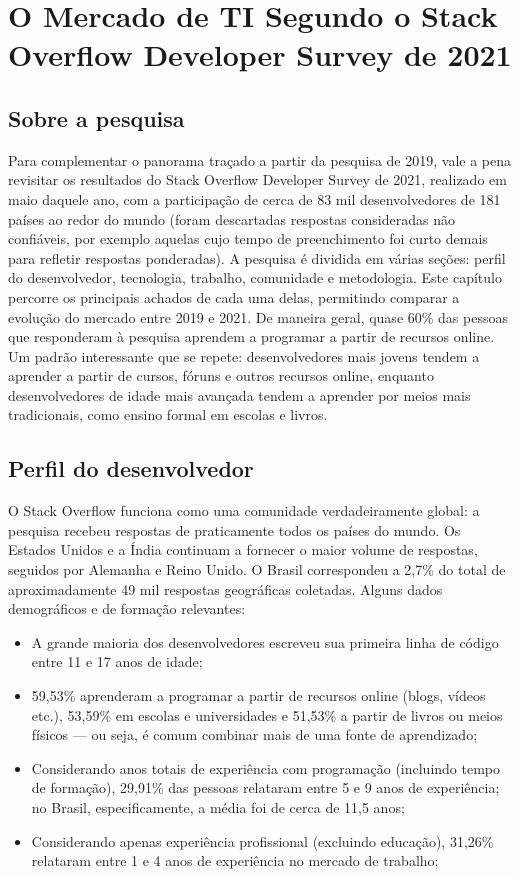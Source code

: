 \chapter{O Mercado de TI Segundo o Stack Overflow Developer Survey de 2021}

\section{Sobre a pesquisa}

Para complementar o panorama traçado a partir da pesquisa de 2019, vale a pena revisitar os resultados do Stack Overflow Developer Survey de 2021, realizado em maio daquele ano, com a participação de cerca de 83 mil desenvolvedores de 181 países ao redor do mundo (foram descartadas respostas consideradas não confiáveis, por exemplo aquelas cujo tempo de preenchimento foi curto demais para refletir respostas ponderadas). A pesquisa é dividida em várias seções: perfil do desenvolvedor, tecnologia, trabalho, comunidade e metodologia. Este capítulo percorre os principais achados de cada uma delas, permitindo comparar a evolução do mercado entre 2019 e 2021. De maneira geral, quase 60\% das pessoas que responderam à pesquisa aprendem a programar a partir de recursos online. Um padrão interessante que se repete: desenvolvedores mais jovens tendem a aprender a partir de cursos, fóruns e outros recursos online, enquanto desenvolvedores de idade mais avançada tendem a aprender por meios mais tradicionais, como ensino formal em escolas e livros.

\section{Perfil do desenvolvedor}

O Stack Overflow funciona como uma comunidade verdadeiramente global: a pesquisa recebeu respostas de praticamente todos os países do mundo. Os Estados Unidos e a Índia continuam a fornecer o maior volume de respostas, seguidos por Alemanha e Reino Unido. O Brasil correspondeu a 2,7\% do total de aproximadamente 49 mil respostas geográficas coletadas. Alguns dados demográficos e de formação relevantes:

\begin{itemize}
  \item A grande maioria dos desenvolvedores escreveu sua primeira linha de código entre 11 e 17 anos de idade;
  \item 59,53\% aprenderam a programar a partir de recursos online (blogs, vídeos etc.), 53,59\% em escolas e universidades e 51,53\% a partir de livros ou meios físicos — ou seja, é comum combinar mais de uma fonte de aprendizado;
  \item Considerando anos totais de experiência com programação (incluindo tempo de formação), 29,91\% das pessoas relataram entre 5 e 9 anos de experiência; no Brasil, especificamente, a média foi de cerca de 11,5 anos;
  \item Considerando apenas experiência profissional (excluindo educação), 31,26\% relataram entre 1 e 4 anos de experiência no mercado de trabalho;
\end{itemize}

